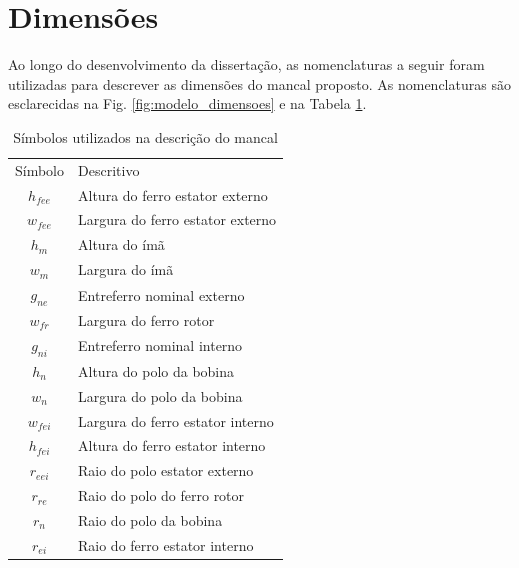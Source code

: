 \section{Dimensões}

Ao longo do desenvolvimento da dissertação, as nomenclaturas a seguir foram utilizadas para descrever as dimensões do mancal proposto. As nomenclaturas são esclarecidas na Fig. \ref{fig:modelo_dimensoes} e na Tabela \ref{tab:modelo:dimensoes:nomenclatura}.

\begin{table}[ht!]
	\centering
	\begin{tabular}{c l}
		Símbolo & Descritivo \\
		$h_{fee}$	& Altura do ferro estator externo \\
		$w_{fee}$	& Largura do ferro estator externo\\
		
		$h_m$		& Altura do ímã \\
		$w_m$		& Largura do ímã \\

		$g_{ne}$	& Entreferro nominal externo \\
		
		$w_{fr}$	& Largura do ferro rotor \\
		
		$g_{ni}$	& Entreferro nominal interno \\
		
		$h_n$		& Altura do polo da bobina \\
		$w_n$		& Largura do polo da bobina \\
		
		$w_{fei}$	& Largura do ferro estator interno \\
		$h_{fei}$	& Altura do ferro estator interno \\

		$r_{eei}$	& Raio do polo estator externo \\				
		$r_{re}$	& Raio do polo do ferro rotor \\		
		$r_{n}$		& Raio do polo da bobina \\		
		$r_{ei}$	& Raio do ferro estator interno \\		
		
	\end{tabular} 
	\caption{Símbolos utilizados na descrição do mancal}
	\label{tab:modelo:dimensoes:nomenclatura}
\end{table}


